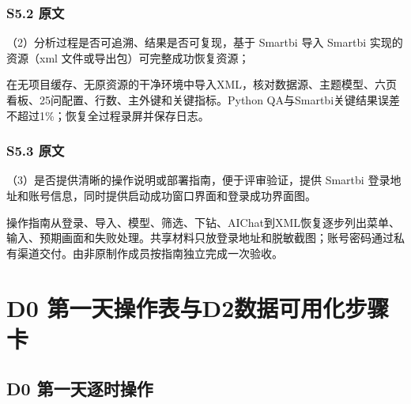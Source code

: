 \subsection*{S5.2 原文}
（2）分析过程是否可追溯、结果是否可复现，基于 Smartbi 导入 Smartbi 实现的资源（xml 文件或导出包）可完整成功恢复资源；

\begin{decisionbox}[S5.2 怎么做]
在无项目缓存、无原资源的干净环境中导入XML，核对数据源、主题模型、六页看板、25问配置、行数、主外键和关键指标。Python QA与Smartbi关键结果误差不超过1\%；恢复全过程录屏并保存日志。
\end{decisionbox}

\subsection*{S5.3 原文}
（3）是否提供清晰的操作说明或部署指南，便于评审验证，提供 Smartbi 登录地址和账号信息，同时提供启动成功窗口界面和登录成功界面图。

\begin{decisionbox}[S5.3 怎么做]
操作指南从登录、导入、模型、筛选、下钻、AIChat到XML恢复逐步列出菜单、输入、预期画面和失败处理。共享材料只放登录地址和脱敏截图；账号密码通过私有渠道交付。由非原制作成员按指南独立完成一次验收。
\end{decisionbox}

\chapter{D0 第一天操作表与D2数据可用化步骤卡}

\section{D0 第一天逐时操作}

